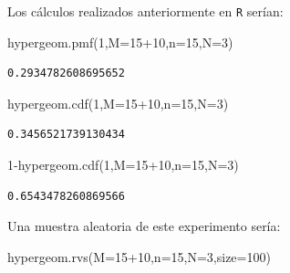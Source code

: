 \documentclass[
  letterpaper,
  DIV=11,
  numbers=noendperiod]{scrreprt}
\newenvironment{Shaded}{\begin{snugshade}}{\end{snugshade}}
\newcommand{\DecValTok}[1]{\textcolor[rgb]{0.68,0.00,0.00}{#1}}
\newcommand{\NormalTok}[1]{\textcolor[rgb]{0.00,0.23,0.31}{#1}}
\newcommand{\OperatorTok}[1]{\textcolor[rgb]{0.37,0.37,0.37}{#1}}
\begin{document}
Los cálculos realizados anteriormente en \texttt{R} serían:

\begin{Shaded}
\begin{Highlighting}[]
\NormalTok{hypergeom.pmf(}\DecValTok{1}\NormalTok{,M}\OperatorTok{=}\DecValTok{15}\OperatorTok{+}\DecValTok{10}\NormalTok{,n}\OperatorTok{=}\DecValTok{15}\NormalTok{,N}\OperatorTok{=}\DecValTok{3}\NormalTok{)}
\end{Highlighting}
\end{Shaded}

\begin{verbatim}
0.2934782608695652
\end{verbatim}

\begin{Shaded}
\begin{Highlighting}[]
\NormalTok{hypergeom.cdf(}\DecValTok{1}\NormalTok{,M}\OperatorTok{=}\DecValTok{15}\OperatorTok{+}\DecValTok{10}\NormalTok{,n}\OperatorTok{=}\DecValTok{15}\NormalTok{,N}\OperatorTok{=}\DecValTok{3}\NormalTok{)}
\end{Highlighting}
\end{Shaded}

\begin{verbatim}
0.3456521739130434
\end{verbatim}

\begin{Shaded}
\begin{Highlighting}[]
\DecValTok{1}\OperatorTok{{-}}\NormalTok{hypergeom.cdf(}\DecValTok{1}\NormalTok{,M}\OperatorTok{=}\DecValTok{15}\OperatorTok{+}\DecValTok{10}\NormalTok{,n}\OperatorTok{=}\DecValTok{15}\NormalTok{,N}\OperatorTok{=}\DecValTok{3}\NormalTok{)}
\end{Highlighting}
\end{Shaded}

\begin{verbatim}
0.6543478260869566
\end{verbatim}

Una muestra aleatoria de este experimento sería:

\begin{Shaded}
\begin{Highlighting}[]
\NormalTok{hypergeom.rvs(M}\OperatorTok{=}\DecValTok{15}\OperatorTok{+}\DecValTok{10}\NormalTok{,n}\OperatorTok{=}\DecValTok{15}\NormalTok{,N}\OperatorTok{=}\DecValTok{3}\NormalTok{,size}\OperatorTok{=}\DecValTok{100}\NormalTok{)}
\end{Highlighting}
\end{Shaded}
\end{document}

